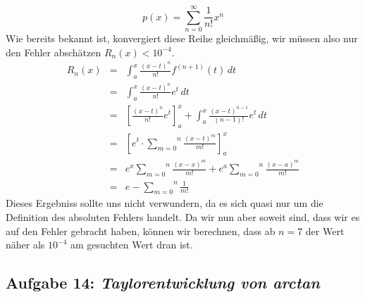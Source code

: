 \documentclass[11pt,a4paper,ngerman]{article}
\begin{document}
\begin{enumerate}[(i)]
        $$
            p(x) = \overset{\infty}{\underset{n=0}{\sum}} \frac{1}{n!}x^n
        $$
        Wie bereits bekannt ist, konvergiert diese Reihe gleichmäßig, wir müssen also nur den Fehler
        abschätzen $R_n(x) < 10^{-4}$.
        $$\begin{array}{rcl}
            R_n(x) &=& \int_a^x \frac{(x-t)^n}{n!} f^{(n+1)}(t) \, dt \\
                &=& \int_a^x \frac{(x-t)^n}{n!} e^t \, dt\\
                &=& \left[ \frac{(x-t)^n}{n!}e^t \right]_a^x +  \int_a^x \frac{(x-t)^{n-1}}{(n-1)!}e^t \, dt\\
                &=& \left[ e^t \cdot \overset{n}{\underset{m=0}{\sum}} \frac{(x-t)^m}{m!} \right]_a^x\\
                &=& e^x \overset{n}{\underset{m=0}{\sum}} \frac{(x-x)^m}{m!} + 
                    e^a \overset{n}{\underset{m=0}{\sum}} \frac{(x-a)^m}{m!}\\
                &=& e - \overset{n}{\underset{m=0}{\sum}} \frac{1}{m!}
        \end{array}$$
        Dieses Ergebniss sollte uns nicht verwundern, da es sich quasi nur um die Definition
        des absoluten Fehlers handelt. Da wir nun aber soweit sind, dass wir es auf den
        Fehler gebracht haben, können wir berechnen, dass ab $n=7$ der Wert näher als $10^{-4}$
        am gesuchten Wert dran ist.
\end{enumerate}

\subsection*{Aufgabe 14: \mdseries\itshape Taylorentwicklung von arctan}
\end{document}
